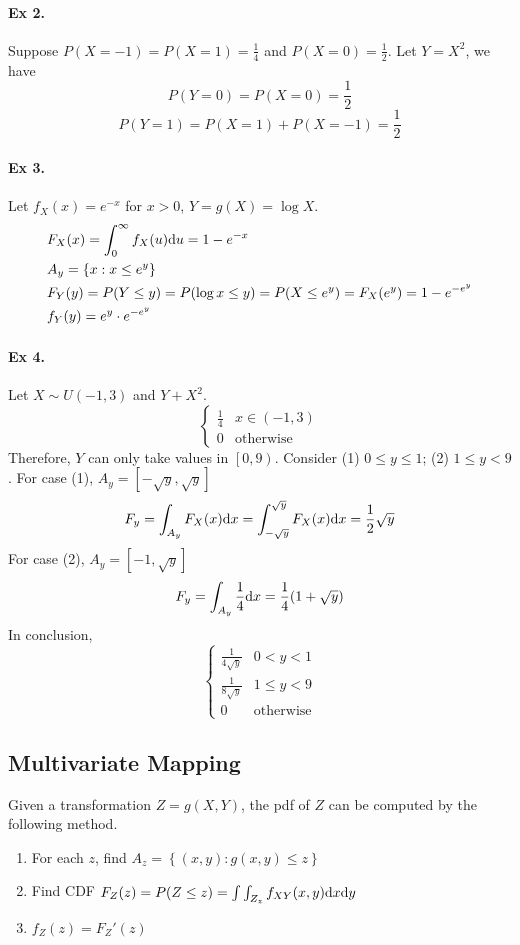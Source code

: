 	\paragraph{Ex 2.}
	Suppose $P(X=-1) = P(X=1) = \frac{1}{4}$ and $P(X=0) = \frac{1}{2}$. Let $Y = X^2$, we have 
	$$P(Y = 0) = P(X=0) = \frac{1}{2}$$
	$$P(Y=1) = P(X = 1)+ P(X=-1) = \frac{1}{2}$$
	
	\paragraph{Ex 3.}Let $f_X(x) = e^{-x}$ for $x>0$, $Y = g(X) =\log X$.
	\begin{align*}
		& F_X(x) = \int_{0}^{\infty}f_X(u)\mathrm{d} u = 1-e^{-x}\\
		& A_y = \{x:x\leq e^y\}\\
		& F_Y(y) = P(Y\leq y) = P(\log x\leq y)=P(X\leq e^y) = F_X(e^y) = 1-e^{-e^y}\\
		& f_Y(y) = e^y\cdot e^{-e^y}
	\end{align*}
	
	\paragraph{Ex 4.} Let $X\sim U(-1, 3)$ and $Y+X^2$.
	\begin{equation}
		\left\{
		\begin{array}{ll}
			\frac{1}{4} & x\in (-1,3)\\
			0 & \text{otherwise}
		\end{array}
		\right.
	\end{equation}
	Therefore, $Y$ can only take values in $\left[0,9\right)$. Consider (1) $0\leq y\leq 1$; (2) $1\leq y < 9$.
	For case (1), $A_y = \left[-\sqrt{y},\sqrt{y}\right]$
	$$F_y = \int_{A_y}F_X(x)\mathrm{d} x = \int_{-\sqrt{y}}^{\sqrt{y}} F_X(x)\mathrm{d} x = \frac{1}{2}\sqrt{y}$$
	For case (2), $A_y = \left[-1, \sqrt{y}\right]$
	$$F_y = \int_{A_y}\frac{1}{4}\mathrm{d} x = \frac{1}{4}(1+\sqrt{y})$$
	In conclusion,
	$$
	\left\{
		\begin{array}{ll}
			\frac{1}{4\sqrt{y}} & 0<y<1\\
			\frac{1}{8\sqrt{y}} & 1\leq y<9\\
			0 & \text{otherwise}
		\end{array}
	\right.
	$$
	
	\subsection{Multivariate Mapping}
	\begin{theorem}
		Given a transformation $Z = g(X, Y)$, the pdf of $Z$ can be computed by the following method.
		\begin{enumerate}[Step (1)]
			\item For each $z$, find $A_z = \left\{(x,y):g(x,y)\leq z\right\}$
			\item Find CDF $F_Z(z) = P(Z\leq z) = \int\int_{Z_z}f_{XY}(x,y)\mathrm{d} x\mathrm{d} y$
			\item $f_Z(z) = F_Z'(z)$
		\end{enumerate}
	\end{theorem}

